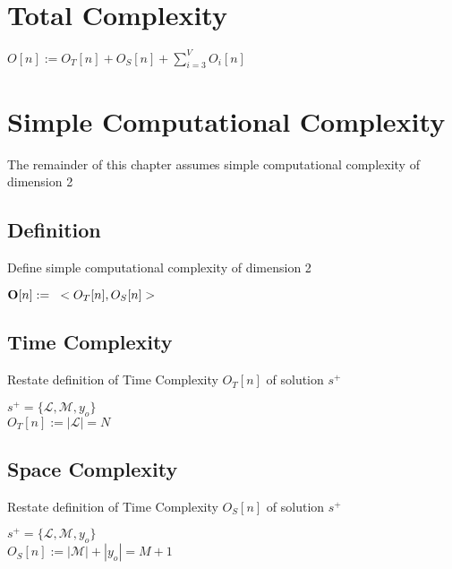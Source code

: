 \documentclass[11pt]{article}
\begin{document}
\section{Total Complexity}
\begin{center}
$O[n] := O_T[n] + O_S[n] + \sum_{i=3}^{V} O_i[n]$
\end{center}





















\newpage
\section{Simple Computational Complexity}
The remainder of this chapter assumes simple computational complexity of dimension 2

\subsection{Definition}
Define simple computational complexity of dimension 2
\begin{center}
$
\bold{O}[n] := \hspace{3mm} < O_T [n], O_S [n] >
$
\end{center}





\subsection{Time Complexity}
Restate definition of Time Complexity $O_T[n]$ of solution $s^+$
\begin{center}
$
s^+ = \{ \mathcal{L},\mathcal{M},y_o\}
$
\\ \vspace{3mm}
$
O_T[n] := |\mathcal{L}| = N
$
\end{center}



\subsection{Space Complexity}
Restate definition of Time Complexity $O_S[n]$ of solution $s^+$
\begin{center}
$
s^+ = \{ \mathcal{L},\mathcal{M},y_o\}
$
\\ \vspace{2mm}
$
O_S[n] := |\mathcal{M}| + |y_o| = M + 1
$
\end{center}
\end{document}
